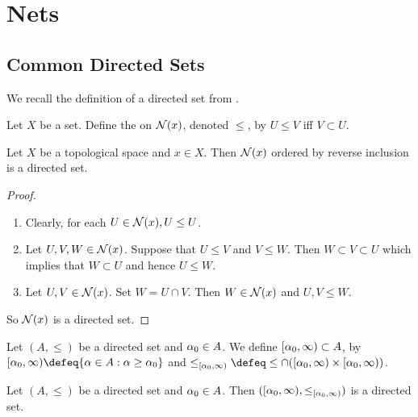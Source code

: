 \documentclass{book}
\begin{document}
\newpage
\section{Nets}	

\subsection{Common Directed Sets}

	\begin{note}
		We recall the definition of a directed set from .
	\end{note}
	
	\begin{defn} 
	Let $X$ be a set. Define the  on $\mathcal{N}(x)$, denoted $\leq$, by $U \leq V$ iff $V \subset U$. 
	\end{defn}
	
	\begin{ex} 
	Let $X$ be a topological space and $x \in X$. Then $\mathcal{N}(x)$ ordered by reverse inclusion is a directed set.
	\end{ex}
	
	\begin{proof}\
	\begin{enumerate}
	\item Clearly, for each $U \in \mathcal{N}(x), U \leq U$.
	\item Let $U,V,W \in \mathcal{N}(x)$. Suppose that $U \leq V$ and $V \leq W$. Then $W \subset V \subset U$ which implies that $W \subset U$ and hence $U \leq W$.
	\item Let $U,V \in \mathcal{N}(x)$. Set $W = U \cap V$. Then $W \in \mathcal{N}(x)$ and $U,V \leq W$. 
	\end{enumerate}
	So $\mathcal{N}(x)$ is a directed set. 
	\end{proof}

	\begin{defn}
		Let $(A, \leq)$ be a directed set and $\alpha_0 \in A$. We define $[\alpha_0, \infty) \subset A$, by $[\al_0, \infty) \defeq \{\al \in A: \al \geq \al_0\}$ and $\leq_{[\al_0, \infty)} \defeq \leq \cap ([\al_0, \infty) \times [\al_0, \infty))$.
	\end{defn}

	\begin{ex} 
		Let $(A, \leq)$ be a directed set and $\alpha_0 \in A$. Then $([\alpha_0, \infty), \leq_{[\alpha_0, \infty)})$ is a directed set. 
	\end{ex}
\end{document}
